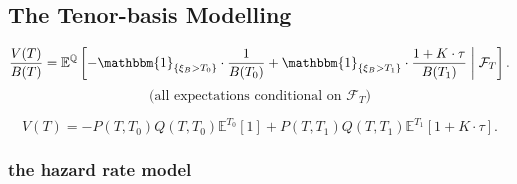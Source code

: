 \documentclass[a4paper,11pt]{book}
\theoremstyle{definition}
\theoremstyle{remark}
\begin{document}
\subsection{The Tenor-basis Modelling}


\[
\frac{V(T)}{B(T)} = \mathbb{E}^{\mathbb{Q}} \left[
-\mathbbm{1}_{\{\xi_B > T_0\}} \cdot \frac{1}{B(T_0)} 
+ \mathbbm{1}_{\{\xi_B > T_1\}} \cdot \frac{1 + K \cdot \tau}{B(T_1)}
\;\middle|\; \mathcal{F}_T \right].
\]
\[
\text{(all expectations conditional on } \mathcal{F}_T \text{)}
\]

\[
V(T) = -P(T, T_0) Q(T, T_0) \mathbb{E}^{T_0}[1] 
+ P(T, T_1) Q(T, T_1) \mathbb{E}^{T_1}[1 + K \cdot \tau].
\]

\subsubsection{the hazard rate model}
\end{document}
